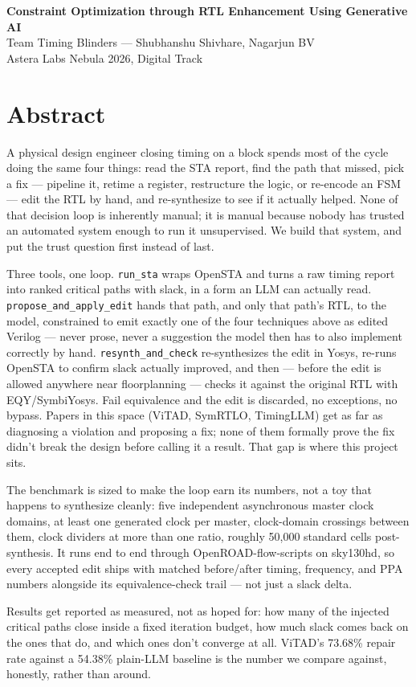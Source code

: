 \documentclass[11pt]{article}
\begin{document}
\pagestyle{empty}

\begin{center}
{\LARGE\bfseries Constraint Optimization through RTL Enhancement Using Generative AI}\\[6pt]
{\large Team Timing Blinders --- Shubhanshu Shivhare, Nagarjun BV}\\[4pt]
{\small Astera Labs Nebula 2026, Digital Track}
\end{center}

\vspace{8pt}

\section*{Abstract}

A physical design engineer closing timing on a block spends most of the
cycle doing the same four things: read the STA report, find the path that
missed, pick a fix --- pipeline it, retime a register, restructure the logic,
or re-encode an FSM --- edit the RTL by hand, and re-synthesize to see if it
actually helped. None of that decision loop is inherently manual; it is
manual because nobody has trusted an automated system enough to run it
unsupervised. We build that system, and put the trust question first instead
of last.

Three tools, one loop. \texttt{run\_sta} wraps OpenSTA and turns a raw timing
report into ranked critical paths with slack, in a form an LLM can actually
read. \texttt{propose\_and\_apply\_edit} hands that path, and only that path's
RTL, to the model, constrained to emit exactly one of the four techniques
above as edited Verilog --- never prose, never a suggestion the model then
has to also implement correctly by hand. \texttt{resynth\_and\_check}
re-synthesizes the edit in Yosys, re-runs OpenSTA to confirm slack actually
improved, and then --- before the edit is allowed anywhere near floorplanning
--- checks it against the original RTL with EQY/SymbiYosys. Fail equivalence
and the edit is discarded, no exceptions, no bypass. Papers in this space
(ViTAD, SymRTLO, TimingLLM) get as far as diagnosing a violation and
proposing a fix; none of them formally prove the fix didn't break the
design before calling it a result. That gap is where this project sits.

The benchmark is sized to make the loop earn its numbers, not a toy that
happens to synthesize cleanly: five independent asynchronous master clock
domains, at least one generated clock per master, clock-domain crossings
between them, clock dividers at more than one ratio, roughly 50{,}000 standard
cells post-synthesis. It runs end to end through OpenROAD-flow-scripts on
sky130hd, so every accepted edit ships with matched before/after timing,
frequency, and PPA numbers alongside its equivalence-check trail --- not just
a slack delta.

Results get reported as measured, not as hoped for: how many of the injected
critical paths close inside a fixed iteration budget, how much slack comes
back on the ones that do, and which ones don't converge at all. ViTAD's
73.68\% repair rate against a 54.38\% plain-LLM baseline is the number we
compare against, honestly, rather than around.
\end{document}
